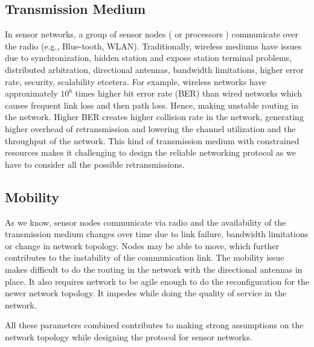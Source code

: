 	\subsection{Transmission Medium}
		In sensor networks, a group of sensor nodes ( or processors ) communicate over the radio (e.g., Blue-tooth, WLAN).
		Traditionally, wireless mediums have issues due to synchronization, hidden station and expose station terminal problems, distributed arbitration, directional antennas, bandwidth limitations, higher error rate, security, scalability etcetera.
		For example, wireless networks have approximately $10^6$ times higher bit error rate (BER) than wired networks which causes frequent link loss and then path loss. 
		Hence, making unstable routing in the network.
		Higher BER creates higher collision rate in the network, generating higher overhead of retransmission and lowering the channel utilization and the throughput of the network.
		This kind of transmission medium with constrained resources makes it challenging to design the reliable networking protocol as we have to consider all the possible retransmissions.

	\subsection{Mobility}
		As we know, sensor nodes communicate via radio and the availability of the transmission medium changes over time due to link failure, bandwidth limitations or change in network topology.
		Nodes may be able to move, which further contributes to the instability of the communication link.
		The mobility issue makes difficult to do the routing in the network with the directional antennas in place.
		It also requires network to be agile enough to do the reconfiguration for the newer network topology.
		It impedes while doing the quality of service in the network. 
		
	All these parameters combined contributes to making strong assumptions on the network topology while designing the protocol for sensor networks.